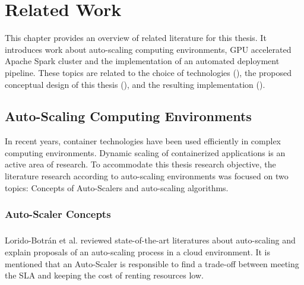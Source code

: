 \chapter{Related Work}
\label{chap:03_related-work}


This chapter provides an overview of related literature for this thesis. It introduces work about auto-scaling computing environments, GPU accelerated Apache Spark cluster and the implementation of an automated deployment pipeline. These topics are related to the choice of technologies (), the proposed conceptual design of this thesis (), and the resulting implementation ().


\section{Auto-Scaling Computing Environments}
In recent years, container technologies have been used efficiently in complex computing environments. Dynamic scaling of containerized applications is an active area of research.
To accommodate this thesis research objective, the literature research according to auto-scaling environments was focused on two topics: Concepts of Auto-Scalers  and auto-scaling algorithms.


\subsection{Auto-Scaler Concepts}
\paragraph{}
Lorido-Botrán et al. \cite{Lorido2014Review} reviewed state-of-the-art literatures about auto-scaling and explain proposals of an auto-scaling process in a cloud environment.
It is mentioned that an Auto-Scaler is responsible to find a trade-off between meeting the SLA and keeping the cost of renting resources low.

